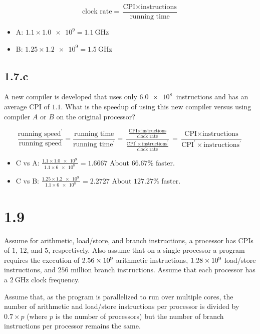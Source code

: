 \documentclass[paper=a4, fontsize=11pt]{scrartcl} %
\begin{document}
$$\text{clock rate} =
\frac{\text{CPI}\times\text{instructions}}{\text{running time}}$$

\begin{itemize}
\item{A:} $1.1\times\SI{1.0e9} = \SI{1.1}{\giga\hertz}$
\item{B:} $1.25\times\SI{1.2e9} = \SI{1.5}{\giga\hertz}$
\end{itemize}

\subsection{1.7.c}
\begin{fancyquotes}
  A new compiler is developed that uses only $\SI{6.0e8}{}$
  instructions and has an average CPI of $1.1$. What is the speedup
  of using this new compiler versus using compiler $A$ or $B$ on the
  original processor?
\end{fancyquotes}

$$\frac{\text{running speed}^\prime}{\text{running speed}}
= \frac{\text{running time}}{\text{running time}^{\prime}}
= \frac{\frac{\text{CPI}\times\text{instructions}}{\text{clock rate}}}
{\frac{\text{CPI}^\prime\times\text{instructions}^\prime}{\text{clock rate}}}
= \frac{\text{CPI}\times\text{instructions}}
{\text{CPI}^\prime\times\text{instructions}^\prime}$$

\begin{itemize}
\item{C vs A:}
  $\frac{1.1\times \SI{1.0e9}{}} {1.1\times \SI{6e8}{}} = 1.6667$
  About $66.67\%$ faster.
\item{C vs B:}
  $\frac{1.25\times \SI{1.2e9}{}} {1.1\times \SI{6e8}{}} = 2.2727$
  About $127.27\%$ faster.
\end{itemize}

\pagebreak

\section{1.9}

\begin{fancyquotes}
  Assume for arithmetic, load/store, and branch instructions, a
  processor has CPIs of $1$, $12$, and $5$, respectively. Also assume
  that on a single processor a program requires the execution of
  $\SI{2.56E9}{}$ arithmetic instructions, $\SI{1.28E9}{}$ load/store
  instructions, and $256$ million branch instructions. Assume that
  each processor has a $\SI{2}{\giga\hertz}$ clock frequency.

  Assume that, as the program is parallelized to run over multiple
  cores, the number of arithmetic and load/store instructions per
  processor is divided by $0.7\times p$ (where $p$ is the number of
  processors) but the number of branch instructions per processor
  remains the same.
\end{fancyquotes}
\end{document}
